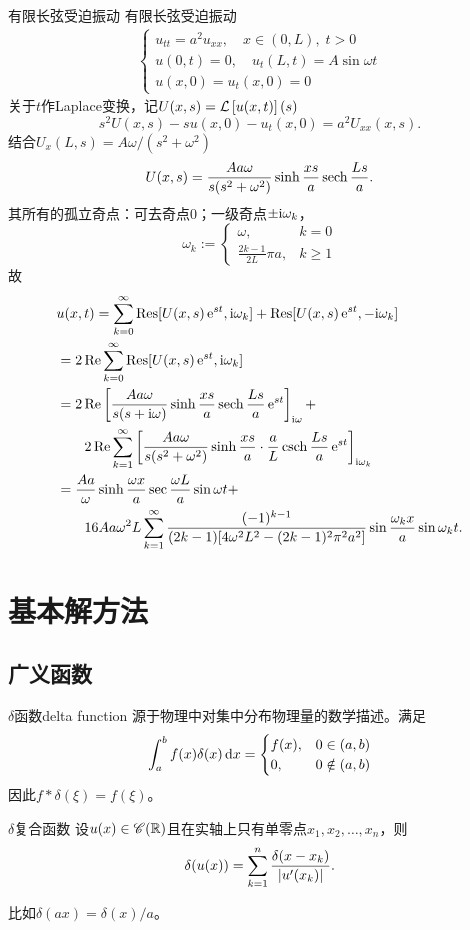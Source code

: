 \begin{example}{有限长弦受迫振动}{}
	有限长弦受迫振动
	\begin{align*}
		\begin{cases}
			u_{tt}=a^2u_{xx},\quad x\in(0,L),\;t>0\\
			u(0,t)=0,\quad u_t(L,t)=A\sin\omega t\\
			u(x,0)=u_t(x,0)=0
		\end{cases}
	\end{align*}
	关于$t$作Laplace变换，记$U(x,s)=\cl{u(x,t)}(s)$
	\[
		s^2U(x,s)-s u(x,0)-u_t(x,0)=a^2U_{xx}(x,s).
	\]
	结合$U_x(L,s)=A\omega/(s^2+\omega^2)$
	\[
		U(x,s)=\frac{Aa\omega}{s(s^2+\omega^2)}\sinh\frac{xs}a\sech\frac{Ls}a.
	\]
	其所有的孤立奇点：可去奇点0；一级奇点$\pm\i\omega_k$，
	\[
		\omega_k:=
		\begin{cases}
			\omega,&k=0\\
			\frac{2k-1}{2L}\pi a,&k\geqslant 1
		\end{cases}
	\]
	故
	\begin{align*}
		&u(x,t)=\sum\fmto k0\Res[U(x,s)\e{st},\i\omega_k]+\Res[U(x,s)\e{st},-\i\omega_k]\\
		&=2\Re\sum\fmto k0\Res[U(x,s)\e{st},\i\omega_k]\\
		&=2\Re\fkh{\frac{Aa\omega}{s(s+\i\omega)}\sinh\frac{xs}a\sech\frac{Ls}a\e{st}}_{\i\omega}+\\
		&\qquad 2\Re\sum\fmto k1\fkh{\frac{Aa\omega}{s(s^2+\omega^2)}\sinh\frac{xs}a\cdot\frac aL\csch\frac{Ls}a\e{st}}_{\i\omega_k}\\
		&=\frac{Aa}\omega\sinh\frac{\omega x}a\sec\frac{\omega L}a\sin\omega t+\\
		&\qquad 16Aa\omega^2L\sum\fmto k1\frac{(-1)^{k-1}}{(2k-1)[4\omega^2L^2-(2k-1)^2\pi^2a^2]}\sin\frac{\omega_kx}a\sin\omega_kt.
	\end{align*}
\end{example}
\clearpage
\section{基本解方法}
\subsection{广义函数}
\begin{definition}{$\delta$函数}{delta function}
	源于物理中对集中分布物理量的数学描述。满足
	\[
		\int_a^bf(x)\delta(x)\d x=
		\begin{cases}
			f(x),&0\in(a,b)\\
			0,&0\notin(a,b)
		\end{cases}
	\]
	因此$f\ast\delta(\xi)=f(\xi)$。
\end{definition}
\begin{theorem}{$\delta$复合函数}{}
	设$u(x)\in\sC(\RR)$且在实轴上只有单零点$x_1,x_2,\ldots,x_n$，则 
	\begin{align}
		\delta(u(x))=\sum\fmto[n]k1\frac{\vd(x-x_k)}{\abs{u'(x_k)}}.
	\end{align}
\end{theorem}
比如$\delta(ax)=\delta(x)/a$。
